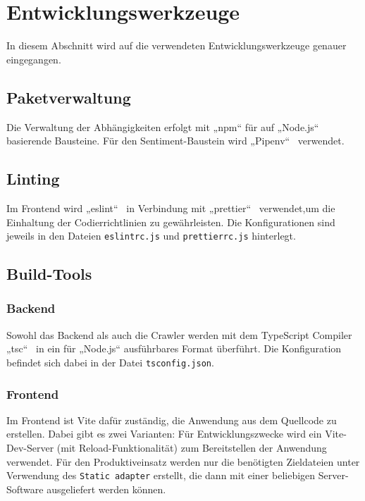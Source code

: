 \documentclass[a4paper, 10pt, conference]{IEEEtran}
\begin{document}
\section{Entwicklungswerkzeuge} \label{s:entwicklungswerkzeuge}

In diesem Abschnitt wird auf die verwendeten Entwicklungswerkzeuge genauer eingegangen.

\subsection{Paketverwaltung}

Die Verwaltung der Abhängigkeiten erfolgt mit „npm“ \cite{npm} für auf „Node.js“ basierende Bausteine. Für den Sentiment-Baustein wird „Pipenv“~\cite{pipenv} verwendet.

\subsection{Linting}

Im Frontend wird „eslint“~\cite{eslint} in Verbindung mit „prettier“~\cite{prettier} verwendet,um die Einhaltung der Codierrichtlinien zu gewährleisten. Die Konfigurationen sind jeweils in den Dateien \texttt{eslintrc.js} und \texttt{prettierrc.js} hinterlegt.

\subsection{Build-Tools}

\subsubsection{Backend}

Sowohl das Backend als auch die Crawler werden mit dem TypeScript Compiler „tsc“~\cite{typescript} in ein für „Node.js“ ausführbares Format überführt. Die Konfiguration befindet sich dabei in der Datei \texttt{tsconfig.json}.

\subsubsection{Frontend}
Im Frontend ist Vite dafür zuständig, die Anwendung aus dem Quellcode zu erstellen. Dabei gibt es zwei Varianten: Für Entwicklungszwecke wird ein Vite-Dev-Server (mit Reload-Funktionalität) zum Bereitstellen der Anwendung verwendet. Für den Produktiveinsatz werden nur die benötigten Zieldateien unter Verwendung des \texttt{Static adapter} erstellt, die dann mit einer beliebigen Server-Software ausgeliefert werden können.
\end{document}
